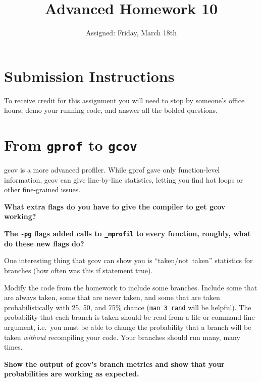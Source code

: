 \documentclass{article}
\begin{document}
\fancyfoot[C]{\color{gray} \thepage~/~\pageref*{LastPage}}
\pagestyle{fancyplain}


\title{\textbf{Advanced Homework 10\\}}
\author{Assigned: Friday, March 18th}
\date{\textbf{\color{red}{Due: Before the first lecture on Friday, April 1}}}
\maketitle


\section*{Submission Instructions}
To receive credit for this assignment you will need to stop by someone's
office hours, demo your running code, and answer all the bolded questions.

\section*{From \texttt{gprof} to \texttt{gcov}}

gcov is a more advanced profiler. While gprof gave only function-level
information, gcov can give line-by-line statistics, letting you find hot loops
or other fine-grained issues.

\textbf{What extra flags do you have to give the compiler to get gcov working?}

\textbf{The \texttt{-pg} flags added calls to \texttt{\_mprofil} to every
  function, roughly, what do these new flags do?}
\vspace{1cm}

One interesting thing that gcov can show you is ``taken/not~taken'' statistics
for branches (how often was this if statement true).

Modify the code from the homework to include some branches. Include some that
are always taken, some that are never taken, and some that are taken
probabilistically with 25, 50, and 75\% chance (\texttt{man~3~rand} will be
helpful). The probability that each branch is taken should be read from a
file or command-line argument, i.e.\ you must be able to change the
probability that a branch will be taken \emph{without} recompiling your code.
Your branches should run many, many times.

\textbf{Show the output of gcov's branch metrics and show that your
  probabilities are working as expected.}
\end{document}

